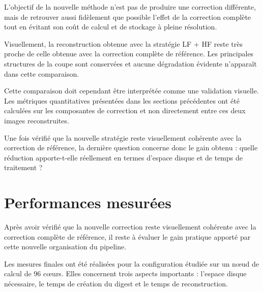 \documentclass[11pt,a4paper]{report}
\begin{document}
L'objectif de la nouvelle méthode n'est pas de produire une correction
différente, mais de retrouver aussi fidèlement que possible l'effet de la
correction complète tout en évitant son coût de calcul et de stockage à
pleine résolution.

Visuellement, la reconstruction obtenue avec la stratégie LF + HF reste
très proche de celle obtenue avec la correction complète de référence. Les
principales structures de la coupe sont conservées et aucune dégradation
évidente n'apparaît dans cette comparaison.

Cette comparaison doit cependant être interprétée comme une validation
visuelle. Les métriques quantitatives présentées dans les sections
précédentes ont été calculées sur les composantes de correction et non
directement entre ces deux images reconstruites.

Une fois vérifié que la nouvelle stratégie reste visuellement cohérente
avec la correction de référence, la dernière question concerne donc le gain
obtenu : quelle réduction apporte-t-elle réellement en termes d'espace
disque et de temps de traitement ?





\chapter{Performances mesurées}

Après avoir vérifié que la nouvelle correction reste visuellement cohérente
avec la correction complète de référence, il reste à évaluer le gain
pratique apporté par cette nouvelle organisation du pipeline.

Les mesures finales ont été réalisées pour la configuration étudiée sur un
nœud de calcul de 96 cœurs. Elles concernent trois aspects importants :
l'espace disque nécessaire, le temps de création du digest et le temps de
reconstruction.
\end{document}
